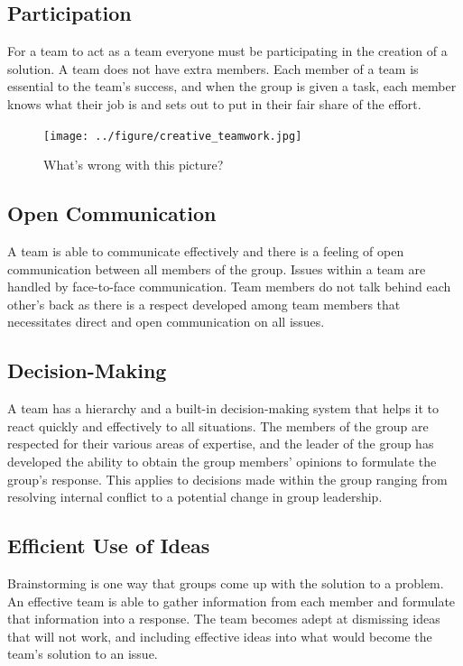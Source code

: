 \documentclass{article}\usepackage[]{graphicx}\usepackage[]{color}
\begin{document}
\subsection{Participation}
For a team to act as a team everyone must be participating in the creation of a solution. A team does not have extra members. Each member of a team is essential to the team's success, and when the group is given a task, each member knows what their job is and sets out to put in their fair share of the effort.

\begin{figure}
\texttt{[image: ../figure/creative\_teamwork.jpg]}
\caption{What's wrong with this picture?}
\end{figure}

\subsection{Open Communication}
A team is able to communicate effectively and there is a feeling of open communication between all members of the group. Issues within a team are handled by face-to-face communication. Team members do not talk behind each other's back as there is a respect developed among team members that necessitates direct and open communication on all issues.

\subsection{Decision-Making}
A team has a hierarchy and a built-in decision-making system that helps it to react quickly and effectively to all situations. The members of the group are respected for their various areas of expertise, and the leader of the group has developed the ability to obtain the group members' opinions to formulate the group's response. This applies to decisions made within the group ranging from resolving internal conflict to a potential change in group leadership.

\subsection{Efficient Use of Ideas}

Brainstorming is one way that groups come up with the solution to a problem. An effective team is able to gather information from each member and formulate that information into a response. The team becomes adept at dismissing ideas that will not work, and including effective ideas into what would become the team's solution to an issue.
\end{document}
